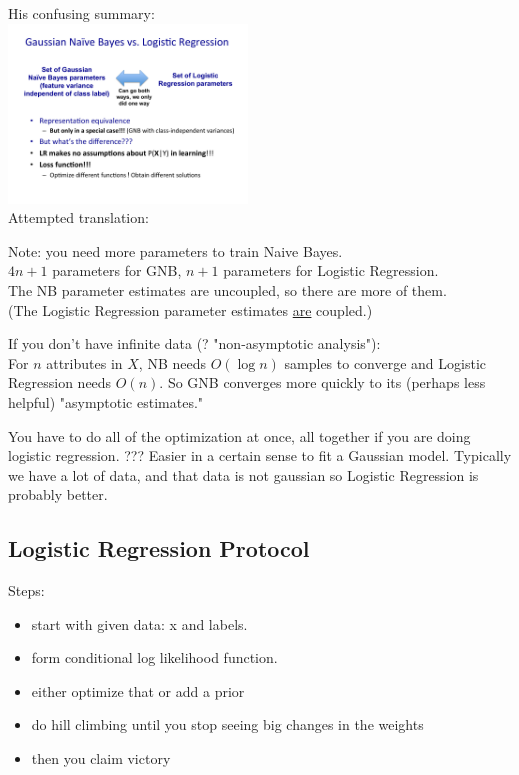  His confusing summary: \hfill \\
 \includegraphics[width=2.5in]{figures/GNB_vs_LR.pdf} \hfill \\
 Attempted translation: 
 
 Note: you need more parameters to train Naive Bayes. \hfill \\
 $4n + 1$ parameters for GNB,  $n + 1$ parameters for Logistic Regression. \hfill \\
 The NB parameter estimates are uncoupled, so there are more of them.   \hfill \\
 (The Logistic Regression parameter estimates \underline{are} coupled.)

If you don't have infinite data (? "non-asymptotic analysis"): \hfill \\
For $n$ attributes in $X$, NB needs $O(\log n)$ samples to converge and Logistic Regression needs $O(n)$.  
So GNB converges more quickly to its (perhaps less helpful) "asymptotic estimates."

You have to do all of the optimization at once, all together if you are doing logistic regression.  ???
Easier in a certain sense to fit a Gaussian model. 
Typically we have a lot of data, and that data is not gaussian so Logistic Regression is probably better. 

\subsection{Logistic Regression Protocol}
Steps:
\begin{itemize}
	\item start with given data: x and labels.
	\item form conditional log likelihood function.
	\item either optimize that or add a prior
	\item do hill climbing until you stop seeing big changes in the weights
	\item then you claim victory
\end{itemize}

